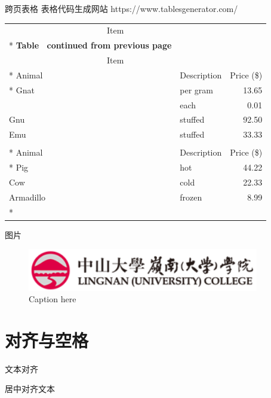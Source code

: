 \documentclass[UTF8,14pt,aspectratio=43,dvipsnames,svgnames,x11names,hyperref={urlcolor=blue}]{beamer}
\begin{document}
\begin{frame}[allowframebreaks]{跨页表格}
	表格代码生成网站 https://www.tablesgenerator.com/
	\begin{longtable}[c]{@{}llr@{}}
		\toprule
		\multicolumn{2}{c}{Item} &            \\* \midrule
		\endfirsthead
		\multicolumn{3}{c}%
		{{\bfseries Table \thetable\ continued from previous page}} \\
		\toprule
		\multicolumn{2}{c}{Item} &            \\* \midrule
		\endhead
		\bottomrule
		\endfoot
		\endlastfoot
		Animal     & Description & Price (\$) \\* \midrule
		Gnat       & per gram    & 13.65      \\
				   & each        & 0.01       \\
		Gnu        & stuffed     & 92.50      \\
		Emu        & stuffed     & 33.33      \\
		\pagebreak  %
		\toprule  %
		\multicolumn{2}{c}{Item} &            \\* \midrule
		Animal     & Description & Price (\$) \\* \midrule
		Pig        & hot         & 44.22      \\
		Cow        & cold        & 22.33      \\
		Armadillo  & frozen      & 8.99       \\* \bottomrule
		\end{longtable}
\end{frame}

\begin{frame}{图片}
	\begin{figure}[tb]
		\centering
		\includegraphics[width=0.9\textwidth]{logo2.png}
		\caption{Caption here\label{fig:figure1}}
	\end{figure}
\end{frame}

\section[对齐与空格]{对齐与空格}
\begin{frame}{文本对齐}
	\begin{center}  %
		居中对齐文本
	\end{center}
\end{frame}
\end{document}
